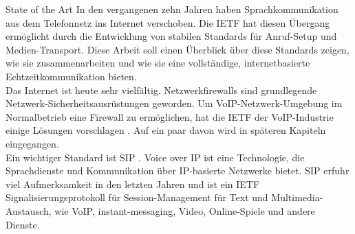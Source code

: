 \label{State of the Art}
\begin{section}{State of the Art}
	In den vergangenen zehn Jahren haben Sprachkommunikation aus dem Telefonnetz ins Internet verschoben.
	\cite{5427399}
	Die \ac{IETF} hat diesen Übergang ermöglicht durch die Entwicklung von 
	stabilen Standards für Anruf-Setup und Medien-Transport.
	Diese Arbeit soll einen Überblick über diese Standards zeigen, wie sie zusammenarbeiten und wie sie
 	eine vollständige, internetbasierte Echtzeitkommunikation bieten.	
	\\
	Das Internet ist heute sehr vielfältig. Netzwerkfirewalls sind grundlegende 
	Netzwerk-Sicherheitsausrüstungen geworden.
	Um VoIP-Netzwerk-Umgebung im Normalbetrieb eine Firewall zu ermöglichen, 
	hat die IETF der VoIP-Industrie einige Lösungen vorschlagen \cite{5474384}.
	Auf ein paar davon wird in späteren Kapiteln eingegangen. 	
 	\\
 	Ein wichtiger Standard ist \ac{SIP} \cite{6103925}.
 	Voice over IP ist eine Technologie, die Sprachdienste und  Kommunikation über IP-basierte Netzwerke bietet. 
 	SIP erfuhr viel Aufmerksamkeit in den letzten Jahren und ist ein IETF Signalisierungsprotokoll 
 	für Session-Management für Text und Multimedia-Austausch, wie VoIP, instant-messaging,
	Video, Online-Spiele und andere Dienste.
	

\end{section}
